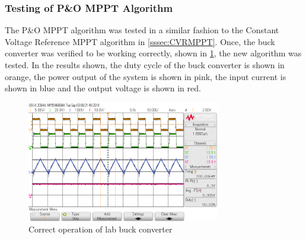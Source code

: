 \documentclass[]{article}
\begin{document}
 			\subsubsection{Testing of P\&O MPPT Algorithm}
 				The P\&O MPPT algorithm was tested in a similar fashion to the Constant Voltage Reference MPPT algorithm in \cref{sssec:CVRMPPT}. Once, the buck converter was verified to be working correctly, shown in \cref{fig:lab4buck}, the new algorithm was tested. In the results shown, the duty cycle of the buck converter is shown in orange, the power output of the system is shown in pink, the input current is shown in blue and the output voltage is shown in red.
 				\begin{figure}[H]
 					\centering
 					\includegraphics[width=0.75\textwidth]{Lab4Results/BuckTest_50DutyCycle_100KHz}
 					\caption{Correct operation of lab buck converter}
 					\label{fig:lab4buck}
 				\end{figure}
 				
\end{document}
